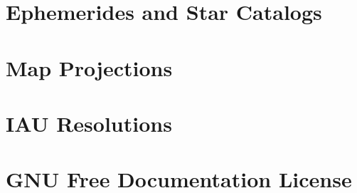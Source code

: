 \documentclass[a4paper,11pt]{scrreport}
\begin{document}
\chapter{Ephemerides and Star Catalogs}
\chapter{Map Projections}


\appendix
\chapter{IAU Resolutions}
	
\chapter{GNU Free Documentation License}\label{License}




\end{document}
